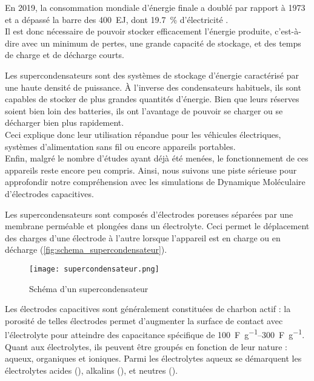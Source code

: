 En 2019, la consommation mondiale d'énergie finale a doublé par rapport à 1973 et a dépassé la barre des \qty{400}{\exa \joule}, dont \qty{19.7}{\percent} d'électricité \cite{birol_key_nodate}.\\
Il est donc nécessaire de pouvoir stocker efficacement l'énergie produite, c'est-à-dire avec un minimum de pertes, une grande capacité de stockage, et des temps de charge et de décharge courts.

Les supercondensateurs sont des systèmes de stockage d'énergie caractérisé par une haute densité de puissance. À l'inverse des condensateurs habituels, ils sont capables de stocker de plus grandes quantités d'énergie.
Bien que leurs réserves soient bien loin des batteries, ils ont l'avantage de pouvoir se charger ou se décharger bien plus rapidement.\\
Ceci explique donc leur utilisation répandue pour les véhicules électriques, systèmes d'alimentation sans fil ou encore appareils portables.\\
Enfin, malgré le nombre d'études ayant déjà été menées, le fonctionnement de ces appareils reste encore peu compris. Ainsi, nous suivons une piste sérieuse\cite{bo_design_2018} pour approfondir notre compréhension avec les simulations de Dynamique Moléculaire d'électrodes capacitives.

Les supercondensateurs sont composés d'électrodes poreuses séparées par une membrane perméable et plongées dans un électrolyte. Ceci permet le déplacement des charges d'une électrode à l'autre lorsque l'appareil est en charge ou en décharge (\autoref{fig:schema_supercondensateur}).

\begin{figure}[hb]
    \centering
    \texttt{[image: supercondensateur.png]}
    \caption{Schéma d'un supercondensateur}
    \label{fig:schema_supercondensateur}
\end{figure}

Les électrodes capacitives sont généralement constituées de charbon actif : la porosité de telles électrodes permet d'augmenter la surface de contact avec l'électrolyte pour atteindre des capacitance spécifique de \qtyrange[range-units = single]{100}{300}{\farad \per \gram}.\\
Quant aux électrolytes, ils peuvent être groupés en fonction de leur nature : aqueux, organiques et ioniques. Parmi les électrolytes aqueux se démarquent\cite{zhong_review_2015} les électrolytes acides (), alkalins (), et neutres ().

